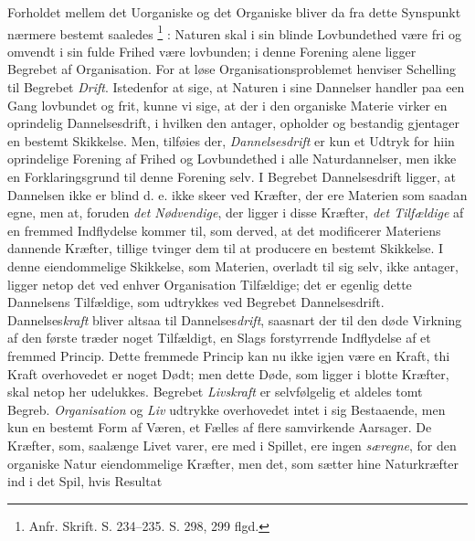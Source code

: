 \documentclass[12pt,a4paper]{book}
\renewcommand{\thefootnote}{*)}
\begin{document}
Forholdet mellem det Uorganiske og det Organiske bliver da fra dette Synspunkt
nærmere bestemt saaledes%
\renewcommand{\thefootnote}{**)}%
\footnote{%
Anfr. Skrift. S. 234--235. S. 298, 299 flgd.}%
\renewcommand{\thefootnote}{*)}%
: Naturen skal i sin blinde Lovbundethed være fri og omvendt i sin fulde Frihed
være lovbunden; i denne Forening alene ligger Begrebet af Organisation. For at
løse Organisationsproblemet henviser Schelling til Begrebet \emph{Drift}.
Istedenfor at sige, at Naturen i sine Dannelser handler paa
een Gang lovbundet og frit, kunne vi sige, at der i den organiske Materie
virker en oprindelig Dannelsesdrift, i hvilken den antager, opholder og
bestandig gjentager en bestemt Skikkelse. Men, tilføies der,
\emph{Dannelsesdrift} er kun et Udtryk for hiin oprindelige Forening af Frihed
og Lovbundethed i alle Naturdannelser, men ikke en Forklaringsgrund til denne
Forening selv. I Begrebet Dannelsesdrift ligger, at Dannelsen ikke er blind
d. e. ikke skeer ved Kræfter, der ere Materien som saadan egne, men at, foruden
\emph{det Nødvendige}, der ligger i disse Kræfter, \emph{det Tilfældige} af en
fremmed Indflydelse kommer til, som derved, at det modificerer Materiens
dannende Kræfter, tillige tvinger dem til at producere en bestemt Skikkelse. I
denne eiendommelige Skikkelse, som Materien, overladt til sig selv, ikke
antager, ligger netop det ved enhver Organisation Tilfældige; det er egenlig
dette Dannelsens Tilfældige, som udtrykkes ved Begrebet Dannelsesdrift.
Dannelses\emph{kraft} bliver altsaa til Dannelses\emph{drift}, saasnart der til
den døde Virkning af den første træder noget Tilfældigt, en Slags forstyrrende
Indflydelse af et fremmed Princip. Dette fremmede Princip kan nu ikke igjen
være en Kraft, thi Kraft overhovedet er noget Dødt; men dette Døde, som ligger
i blotte Kræfter, skal netop her udelukkes. Begrebet \emph{Livskraft} er
selvfølgelig et aldeles tomt Begreb. \emph{Organisation} og \emph{Liv} udtrykke
overhovedet intet i sig Bestaaende, men kun en bestemt Form af Væren, et Fælles
af flere samvirkende Aarsager. De Kræfter, som, saalænge Livet varer, ere med i
Spillet, ere ingen \emph{særegne}, for den organiske Natur eiendommelige
Kræfter, men det, som sætter hine Naturkræfter ind i det Spil, hvis Resultat
\end{document}
